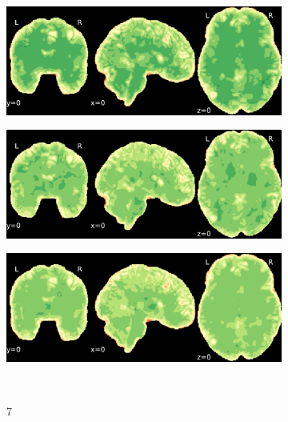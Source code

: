 \documentclass{article}
\begin{document}
\begin{landscape}
\begin{figure}
\begin{subfigure}[t]{0.2\paperheight}
        \end{subfigure}
        \begin{subfigure}[t]{0.2\paperheight}
            \centering
            \includegraphics[width=\textwidth]{figures/sig/fwhm_5/rr_ds001748_sub-adult16_sig.pdf}
        \end{subfigure}
        \begin{subfigure}[t]{0.2\paperheight}
            \centering
            \includegraphics[width=\textwidth]{figures/sig/fwhm_5/rs_ds001748_sub-adult16_sig.pdf}
        \end{subfigure}
        \begin{subfigure}[t]{0.2\paperheight}
            \centering
            \includegraphics[width=\textwidth]{figures/sig/fwhm_5/rr.rs_ds001748_sub-adult16_sig.pdf}
        \end{subfigure} \\
        \begin{subfigure}[b][][c]{0.01\paperwidth} 7 \vspace*{15pt} \end{subfigure}

\end{figure}
\end{landscape}
\end{document}
